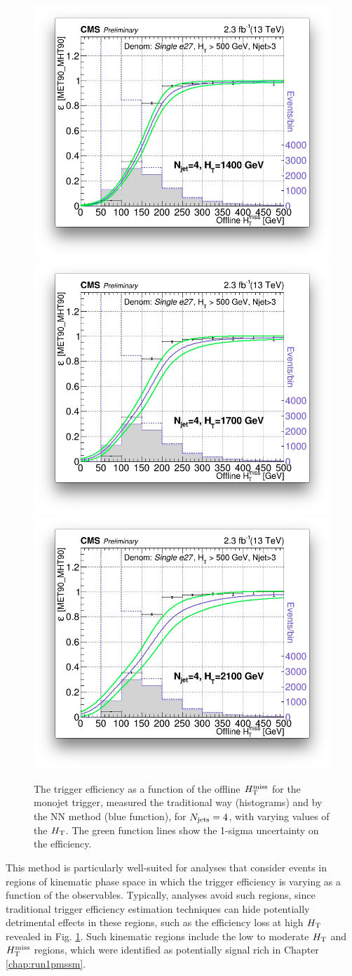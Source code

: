 \begin{figure}[tb!]
\begin{center}
    \includegraphics[width=0.49\linewidth]{figures/trigger/MonoTrigEff_Ht1400.png}\\
        \includegraphics[width=0.49\linewidth]{figures/trigger/MonoTrigEff_Ht1700.png}
    \includegraphics[width=0.49\linewidth]{figures/trigger/MonoTrigEff_Ht2100.png}
    \caption{The trigger efficiency as a function of the offline $H_{\text{T}}^{\rm miss}$ for the monojet trigger, measured the traditional way (histograms) and by the NN method (blue function), for $N_{\rm jets}=4$, with varying values of the $H_{\rm T}$. The green function lines show the 1-sigma uncertainty on the efficiency. }
    \label{fig:mvatrigger}
  \end{center}
\end{figure}
\noindent

This method is particularly well-suited for analyses that consider events in regions of kinematic phase space in which the trigger efficiency is varying as a function of the observables.  Typically, analyses avoid such regions, since traditional trigger efficiency estimation techniques can hide potentially detrimental effects in these regions, such as the efficiency loss at high $H_{\rm T}$ revealed in Fig. \ref{fig:mvatrigger}. Such kinematic regions include the low to moderate $H_{\rm T}$ and $H_{\text{T}}^{\rm miss}$ regions, which were identified as potentially signal rich in Chapter \ref{chap:run1pmssm}.
\FloatBarrier
